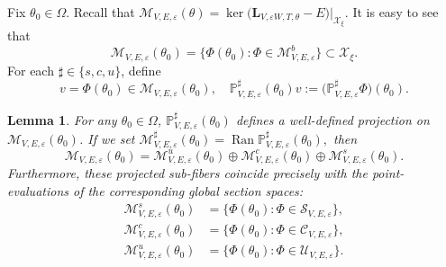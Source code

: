 \documentclass[reqno,11pt]{amsart}
\newtheorem{lemma}{Lemma}[section]
\begin{document}
Fix $\theta_0\in\Omega$.
Recall that  $\mathcal M_{V,E,\varepsilon}(\theta)=
\ker\bigl(\mathbf L_{V,\varepsilon W,T,\theta}-E\bigr){|_{\mathcal{X}_\xi}}$. It is easy to see that
$$
\mathcal{M}_{V,E,\varepsilon}(\theta_0)=
\{\Phi(\theta_0):\Phi\in\mathcal{M}_{V,E,\varepsilon}^b\}
\subset \mathcal{X}_{\xi}.
$$
 For each $\sharp\in\{s,c,u\}$, define
$$
v=\Phi(\theta_0)\in \mathcal{M}_{V,E,\varepsilon}(\theta_0),\quad
\mathbb{P}^\sharp_{V,E,\varepsilon}(\theta_0)v:=
\bigl(\mathbb{P}^\sharp_{V,E,\varepsilon}\Phi\bigr)(\theta_0).
$$
\begin{lemma}
\label{prop:fiber}
For any $\theta_0\in\Omega$, $\mathbb{P}^\sharp_{V,E,\varepsilon}(\theta_0)$ defines a well-defined projection on $\mathcal{M}_{V,E,\varepsilon}(\theta_0)$. If we set
$
\mathcal{M}_{V,E,\varepsilon}^\sharp(\theta_0)=
\operatorname{Ran}\mathbb{P}^\sharp_{V,E,\varepsilon}(\theta_0),
$
then
$$
\mathcal{M}_{V,E,\varepsilon}(\theta_0)=
\mathcal{M}_{V,E,\varepsilon}^u(\theta_0)
\oplus\mathcal{M}_{V,E,\varepsilon}^c(\theta_0)\oplus\mathcal{M}_{V,E,\varepsilon}^s(\theta_0).
$$
Furthermore, these projected sub-fibers coincide precisely with the point-evaluations of the corresponding global section spaces:
$$
\begin{aligned}
\mathcal{M}_{V,E,\varepsilon}^s(\theta_0) &= \bigl\{\Phi(\theta_0) : \Phi\in\mathcal{S}_{V,E,\varepsilon}\bigr\}, \\
\mathcal{M}_{V,E,\varepsilon}^c(\theta_0) &= \bigl\{\Phi(\theta_0) : \Phi\in\mathcal{C}_{V,E,\varepsilon}\bigr\}, \\
\mathcal{M}_{V,E,\varepsilon}^u(\theta_0) &= \bigl\{\Phi(\theta_0) : \Phi\in\mathcal{U}_{V,E,\varepsilon}\bigr\}.
\end{aligned}
$$
\end{lemma}
\end{document}
